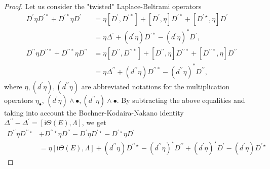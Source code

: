 \documentclass[lang=en,12pt]{beautybook}
\begin{document}
\begin{proof}
Let us consider the "twisted" Laplace-Beltrami operators
$$
\begin{aligned}
D^{\prime} \eta D^{\prime *}+D^{\prime *} \eta D^{\prime} & =\eta\left[D^{\prime}, D^{\prime *}\right]+\left[D^{\prime}, \eta\right] D^{\prime *}+\left[D^{\prime \star}, \eta\right] D^{\prime} \\
& =\eta \Delta^{\prime}+\left(d^{\prime} \eta\right) D^{\prime *}-\left(d^{\prime} \eta\right)^* D^{\prime}, \\
D^{\prime \prime} \eta D^{\prime \prime *}+D^{\prime \prime *} \eta D^{\prime \prime} & =\eta\left[D^{\prime \prime}, D^{\prime \prime *}\right]+\left[D^{\prime \prime}, \eta\right] D^{\prime \prime *}+\left[D^{\prime \prime *}, \eta\right] D^{\prime \prime} \\
& =\eta \Delta^{\prime \prime}+\left(d^{\prime \prime} \eta\right) D^{\prime \prime *}-\left(d^{\prime \prime} \eta\right)^* D^{\prime \prime},
\end{aligned}
$$
where $\eta,\left(d^{\prime} \eta\right),\left(d^{\prime \prime} \eta\right)$ are abbreviated notations for the multiplication operators $\eta_{\bullet}$, $\left(d^{\prime} \eta\right) \wedge \bullet,\left(d^{\prime \prime} \eta\right) \wedge \bullet$. By subtracting the above equalities and taking into account the Bochner-Kodaira-Nakano identity $\Delta^{\prime \prime}-\Delta^{\prime}=[\mathrm{i} \Theta(E), \Lambda]$, we get
$$
\begin{aligned}
D^{\prime \prime} \eta D^{\prime \prime \star} & +D^{\prime \prime \star} \eta D^{\prime \prime}-D^{\prime} \eta D^{\prime \star}-D^{\prime \star} \eta D^{\prime} \\
& =\eta[\mathrm{i} \Theta(E), \Lambda]+\left(d^{\prime \prime} \eta\right) D^{\prime \prime \star}-\left(d^{\prime \prime} \eta\right)^{\star} D^{\prime \prime}+\left(d^{\prime} \eta\right)^{\star} D^{\prime}-\left(d^{\prime} \eta\right) D^{\prime \star}
\end{aligned}
$$


\end{proof}
\end{document}
